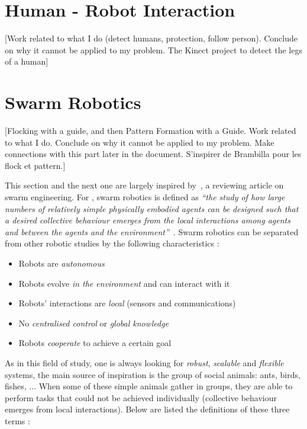 \documentclass[oneside, a4paper, 12pt]{memoir}
\newcommand{\quot}[1]{\textit{\enquote{#1}}}
\begin{document}
	\section{Human - Robot Interaction}
	
	[Work related to what I do (detect humans, protection, follow person). Conclude on why it cannot be applied to my problem. The Kinect project to detect the legs of a human]

	\section{Swarm Robotics}
	
	[Flocking with a guide, and then Pattern Formation with a Guide. Work related to what I do. Conclude on why it cannot be applied to my problem. Make connections with this part later in the document. S'inspirer de Brambilla pour les flock et pattern.]
	
	This section and the next one are largely inspired by~\citet{brambilla2013swarm}, a reviewing article on swarm engineering. For \citet{csahin2005swarm}, swarm robotics is defined as \quot{the study of how large numbers of relatively simple physically embodied agents can be designed such that a desired collective behaviour emerges from the local interactions among agents and between the agents and the environment}~\citep{csahin2005swarm}. Swarm robotics can be separated from other robotic studies by the following characteristics \citep{brambilla2013swarm}:
	
\begin{itemize}
\item Robots are \emph{autonomous}
\item Robots evolve \emph{in the environment} and can interact with it
\item Robots' interactions are \emph{local} (sensors and communications)
\item No \emph{centralised control} or \emph{global knowledge}
\item Robots \emph{cooperate} to achieve a certain goal
\end{itemize}

As in this field of study, one is always looking for \emph{robust}, \emph{scalable} and \emph{flexible} systems, the main source of inspiration is the group of social animals: ants, birds, fishes, ... When some of these simple animals gather in groups, they are able to perform tasks that could not be achieved individually (collective behaviour emerges from local interactions). Below are listed the definitions of these three terms \citep{brambilla2013swarm}:
\end{document}

